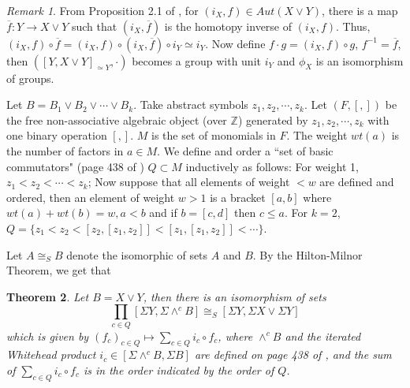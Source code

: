 \documentclass[12pt]{article}
\theoremstyle{theorem}
\newtheorem{theorem}{Theorem}[section]
\theoremstyle{definition}
\theoremstyle{proposition}
\theoremstyle{corollary}
\theoremstyle{lemma}
\theoremstyle{remark}
\newtheorem{remark}[theorem]{Remark}
\theoremstyle{example}
\begin{document}
{\begin{remark}\label{remark 2.3}
From Proposition 2.1 of \cite{YS1}, for $(i_{X},f)\in Aut(X\vee Y)$, there is a map $\overline{f}: Y\rightarrow X\vee Y$ such that $(i_{X},\overline{f})$ is the homotopy inverse of  $(i_{X},f)$. Thus, $(i_{X},f){\ensuremath{{\scriptstyle\circ}}} \overline{f}=(i_{X},f){\ensuremath{{\scriptstyle\circ}}}(i_{X},\overline{f}){\ensuremath{{\scriptstyle\circ}}} i_{Y}\simeq i_{Y}$. Now define $f\cdot g=(i_{X},f){\ensuremath{{\scriptstyle\circ}}} g$,  $f^{-1}=\overline{f}$,  then $([Y,X\vee Y]_{\simeq Y}, \cdot )$ becomes a group with unit $i_{Y}$ and  $\phi_{X}$ is an isomorphism of groups.
\end{remark}

Let $B=B_{1}\vee B_{2}\vee\cdots\vee B_{k}$. Take abstract symbols $z_{1}, z_{2},\cdots,z_{k}$. Let $(F, [,])$ be the free non-associative algebraic object (over $\mathbb{Z}$) generated by $z_{1}, z_{2},\cdots,z_{k}$ with one binary operation $[,]$. $M$ is the set of monomials in $F$. The weight $wt(a)$ is the number of factors in $a\in M$.  We define and order a ``set of basic commutators" (page 438 of \cite{BaHH}) $Q\subset M$ inductively as follows:  For weight 1, $z_{1}<z_{2}<\cdots<z_{k}$; Now suppose that all elements of weight $<w$ are defined and ordered, then an element of weight $w>1$ is a bracket $[a,b]$ where $wt(a)+wt(b)=w, a<b$  and if $b=[c,d]$ then $c\leq a$. For $k=2$,
$Q=\{z_{1}<z_{2}<[z_2,[z_1,z_2]]<[z_1,[z_1,z_2]]<\cdots \}$.

Let $A\cong_{S}B$  denote the isomorphic of sets $A$ and $B$. By the Hilton-Milnor Theorem, we get that
\begin{theorem}\label{theorem 2.4}
  Let $B=X\vee Y$, then there is an isomorphism of sets
  $$\prod\limits_{c\in Q}[\Sigma Y, \Sigma \wedge^{c}B]\cong_{S}[\Sigma Y, \Sigma X\vee \Sigma Y] $$
  which is given by $(f_{c})_{c\in Q}\mapsto \sum\limits_{c\in Q}i_{c}{\ensuremath{{\scriptstyle\circ}}} f_{c}$, where $\wedge^{c}B$ and the iterated Whitehead product $i_{c}\in [\Sigma \wedge^{c}B, \Sigma B]$ are defined on page 438 of \cite{BaHH}, and the sum of $\sum\limits_{c\in Q}i_{c}{\ensuremath{{\scriptstyle\circ}}} f_{c}$ is in the order indicated by the order of $Q$.
 \end{theorem}

}
\end{document}
